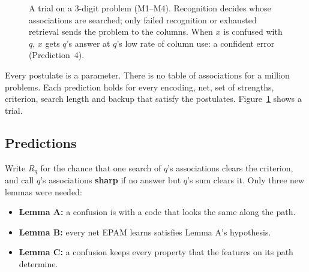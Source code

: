 \documentclass[11pt]{article}
\begin{document}
\begin{figure}[t]
\centering
{}
\caption{A trial on a 3-digit problem (M1--M4). Recognition decides whose associations are searched; only failed recognition or exhausted retrieval sends the problem to the columns. When $x$ is confused with $q$, $x$ gets $q$'s answer at $q$'s low rate of column use: a confident error (Prediction~4).}
\label{fig:trial}
\end{figure}

Every postulate is a parameter. There is no table of associations for a million problems. Each prediction holds for every encoding, net, set of strengths, criterion, search length and backup that satisfy the postulates. Figure~\ref{fig:trial} shows a trial.

\subsection{Predictions}

Write $R_q$ for the chance that one search of $q$'s associations clears the criterion, and call $q$'s associations \textbf{sharp} if no answer but $q$'s sum clears it. Only three new lemmas were needed:
\begin{itemize}
  \item \textbf{Lemma A:} a confusion is with a code that looks the same along the path.
  \item \textbf{Lemma B:} every net EPAM learns satisfies Lemma A's hypothesis.
  \item \textbf{Lemma C:} a confusion keeps every property that the features on its path determine.
\end{itemize}
\end{document}

